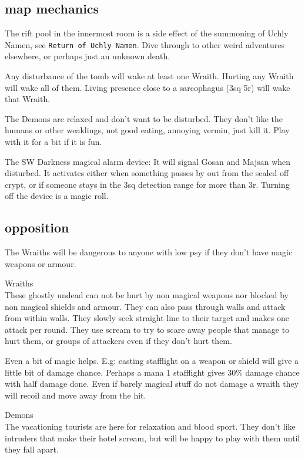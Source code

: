 \subsection*{map mechanics}
The rift pool in the innermost room is a side effect of the summoning of Uchly Namen, see \texttt{Return of Uchly Namen}. Dive through to other weird adventures elsewhere, or perhaps just an unknown death.

Any disturbance of the tomb will wake at least one Wraith. Hurting any Wraith will wake all of them. Living presence close to a sarcophagus (3sq 5r) will wake that Wraith.

The Demons are relaxed and don't want to be disturbed. They don't like the humans or other weaklings, not good eating, annoying vermin, just kill it. Play with it for a bit if it is fun.

The SW Darkness magical alarm device: It will signal Gosan and Majsan when disturbed. It activates either when something passes by out from the sealed off crypt, or if someone stays in the 3sq detection range for more than 3r.
Turning off the device is a magic roll.


\subsection*{opposition}
The Wraiths will be dangerous to anyone with low psy if they don't have magic weapons or armour.


\noindent Wraiths\\
These ghostly undead can not be hurt by non magical weapons nor blocked by non magical shields and armour. They can also pass through walls and attack from within walls. They slowly seek straight line to their target and makes one attack per round. They use scream to try to scare away people that manage to hurt them, or groups of attackers even if they don't hurt them.

Even a bit of magic helps. E.g: casting stafflight on a weapon or shield will give a little bit of damage chance. Perhaps a mana 1 stafflight gives 30\% damage chance with half damage done.
Even if barely magical stuff do not damage a wraith they will recoil and move away from the hit.


\noindent Demons\\
The vacationing tourists are here for relaxation and blood sport. They don't like intruders that make their hotel scream, but will be happy to play with them until they fall apart.

